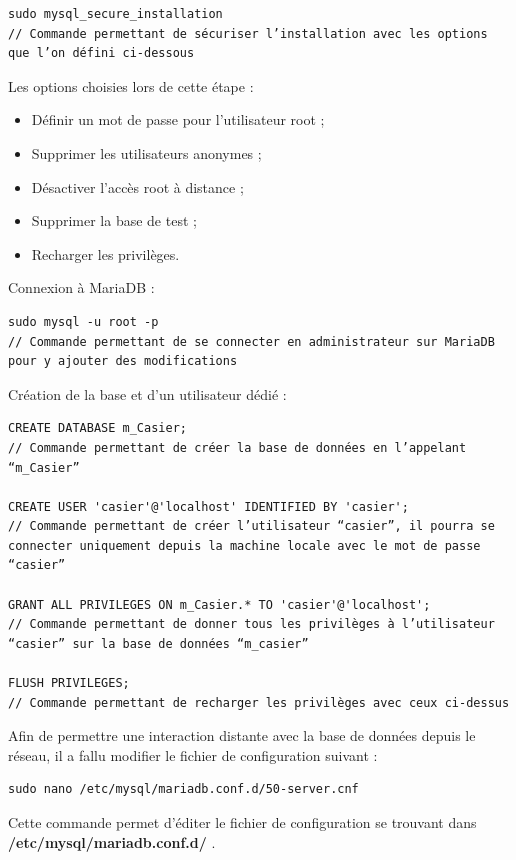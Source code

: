 \documentclass[main.tex]{subfiles}
\begin{document}
\begin{lstlisting}
sudo mysql_secure_installation
// Commande permettant de sécuriser l’installation avec les options que l’on défini ci-dessous
\end{lstlisting}

Les options choisies lors de cette étape :

\begin{itemize}
\item Définir un mot de passe pour l’utilisateur root ;
\item Supprimer les utilisateurs anonymes ;
\item Désactiver l’accès root à distance ;
\item Supprimer la base de test ;
\item Recharger les privilèges.
\end{itemize}

Connexion à MariaDB :

\begin{lstlisting}
sudo mysql -u root -p
// Commande permettant de se connecter en administrateur sur MariaDB pour y ajouter des modifications
\end{lstlisting}

Création de la base et d’un utilisateur dédié :

\begin{lstlisting}
CREATE DATABASE m_Casier;
// Commande permettant de créer la base de données en l’appelant “m_Casier”

CREATE USER 'casier'@'localhost' IDENTIFIED BY 'casier';
// Commande permettant de créer l’utilisateur “casier”, il pourra se connecter uniquement depuis la machine locale avec le mot de passe “casier”

GRANT ALL PRIVILEGES ON m_Casier.* TO 'casier'@'localhost';
// Commande permettant de donner tous les privilèges à l’utilisateur “casier” sur la base de données “m_casier”

FLUSH PRIVILEGES;
// Commande permettant de recharger les privilèges avec ceux ci-dessus
\end{lstlisting}

Afin de permettre une interaction distante avec la base de données depuis le réseau, il a fallu modifier le fichier de configuration suivant :

\begin{lstlisting}
sudo nano /etc/mysql/mariadb.conf.d/50-server.cnf
\end{lstlisting}

Cette commande permet d’éditer le fichier de configuration se trouvant dans \textbf{/etc/mysql/mariadb.conf.d/} .
\end{document}

